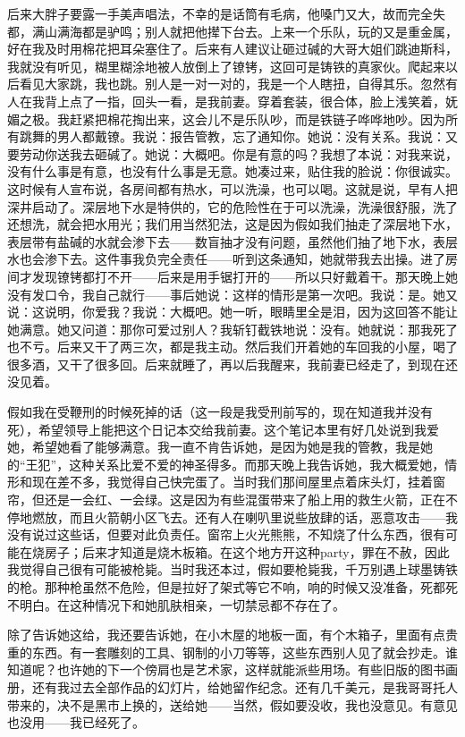 后来大胖子要露一手美声唱法，不幸的是话筒有毛病，他嗓门又大，故而完全失都，满山满海都是驴鸣；别人就把他撵下台去。上来一个乐队，玩的又是重金属，好在我及时用棉花把耳朵塞住了。后来有人建议让砸过碱的大哥大姐们跳迪斯科，我就没有听见，糊里糊涂地被人放倒上了镣铐，这回可是铸铁的真家伙。爬起来以后看见大家跳，我也跳。别人是一对一对的，我是一个人瞎扭，自得其乐。忽然有人在我背上点了一指，回头一看，是我前妻。穿着套装，很合体，脸上浅笑着，妩媚之极。我赶紧把棉花掏出来，这会儿不是乐队吵，而是铁链子哗哗地吵。因为所有跳舞的男人都戴镣。我说：报告管教，忘了通知你。她说：没有关系。我说：又要劳动你送我去砸碱了。她说：大概吧。你是有意的吗？我想了本说：对我来说，没有什么事是有意，也没有什么事是无意。她凑过来，贴住我的脸说：你很诚实。这时候有人宣布说，各房间都有热水，可以洗澡，也可以喝。这就是说，早有人把深井启动了。深层地下水是特供的，它的危险性在于可以洗澡，洗澡很舒服，洗了还想洗，就会把水用光；我们用当然犯法，这是因为假如我们抽走了深层地下水，表层带有盐碱的水就会渗下去——数盲抽才没有问题，虽然他们抽了地下水，表层水也会渗下去。这件事我负完全责任——听到这条通知，她就带我去出操。进了房间才发现镣铐都打不开——后来是用手锯打开的——所以只好戴着干。那天晚上她没有发口令，我自己就行——事后她说：这样的情形是第一次吧。我说：是。她又说：这说明，你爱我？我说：大概吧。她一听，眼睛里全是泪，因为这回答不能让她满意。她又问道：那你可爱过别人？我斩钉截铁地说：没有。她就说：那我死了也不亏。后来又干了两三次，都是我主动。然后我们开着她的车回我的小屋，喝了很多酒，又干了很多回。后来就睡了，再以后我醒来，我前妻已经走了，到现在还没见着。 

假如我在受鞭刑的时候死掉的话（这一段是我受刑前写的，现在知道我并没有死），希望领导上能把这个日记本交给我前妻。这个笔记本里有好几处说到我爱她，希望她看了能够满意。我一直不肯告诉她，是因为她是我的管教，我是她的“王犯”，这种关系比爱不爱的神圣得多。而那天晚上我告诉她，我大概爱她，情形和现在差不多，我觉得自己快完蛋了。当时我们那间屋里点着床头灯，挂着窗帘，但还是一会红、一会绿。这是因为有些混蛋带来了船上用的救生火箭，正在不停地燃放，而且火箭朝小区飞去。还有人在喇叭里说些放肆的话，恶意攻击——我没有说过这些话，但要对此负责任。窗帘上火光熊熊，不知烧了什么东西，很有可能在烧房子；后来才知道是烧木板箱。在这个地方开这种party，罪在不赦，因此我觉得自己很有可能被枪毙。当时我还本过，假如要枪毙我，千万别遇上球墨铸铁的枪。那种枪虽然不危险，但是拉好了架式等它不响，响的时候又没准备，死都死不明白。在这种情况下和她肌肤相亲，一切禁忌都不存在了。 

除了告诉她这给，我还要告诉她，在小木屋的地板一面，有个木箱子，里面有点贵重的东西。有一套雕刻的工具、钢制的小刀等等，这些东西别人见了就会抄走。谁知道呢？也许她的下一个傍肩也是艺术家，这样就能派些用场。有些旧版的图书画册，还有我过去全部作品的幻灯片，给她留作纪念。还有几千美元，是我哥哥托人带来的，决不是黑市上换的，送给她——当然，假如要没收，我也没意见。有意见也没用——我已经死了。

